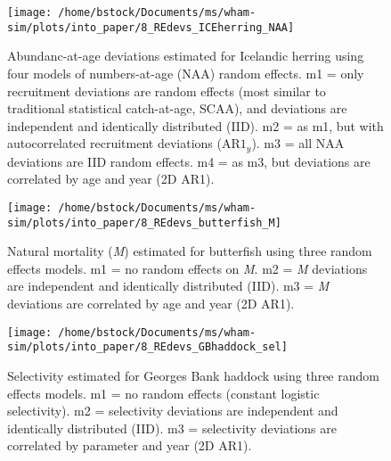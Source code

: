 \documentclass[]{article}
\begin{document}
\begin{figure}

{\centering \texttt{[image: /home/bstock/Documents/ms/wham-sim/plots/into\_paper/8\_REdevs\_ICEherring\_NAA]} 

}

\caption{Abundanc-at-age deviations estimated for Icelandic herring using four models of numbers-at-age (NAA) random effects. m1 = only recruitment deviations are random effects (most similar to traditional statistical catch-at-age, SCAA), and deviations are independent and identically distributed (IID). m2 = as m1, but with autocorrelated recruitment deviations ($\text{AR1}_y$). m3 = all NAA deviations are IID random effects. m4 = as m3, but deviations are correlated by age and year (2D AR1).}\label{fig:devs-ICEherring-naa}
\end{figure}

\pagebreak

\begin{figure}

{\centering \texttt{[image: /home/bstock/Documents/ms/wham-sim/plots/into\_paper/8\_REdevs\_butterfish\_M]} 

}

\caption{Natural mortality (\textit{M}) estimated for butterfish using three random effects models. m1 = no random effects on \textit{M}. m2 = \textit{M} deviations are independent and identically distributed (IID). m3 = \textit{M} deviations are correlated by age and year (2D AR1).}\label{fig:devs-butterfish-m}
\end{figure}

\pagebreak

\begin{figure}

{\centering \texttt{[image: /home/bstock/Documents/ms/wham-sim/plots/into\_paper/8\_REdevs\_GBhaddock\_sel]} 

}

\caption{Selectivity estimated for Georges Bank haddock using three random effects models. m1 = no random effects (constant logistic selectivity). m2 = selectivity deviations are independent and identically distributed (IID). m3 = selectivity deviations are correlated by parameter and year (2D AR1).}\label{fig:devs-GBhaddock-sel}
\end{figure}

\pagebreak
\end{document}
